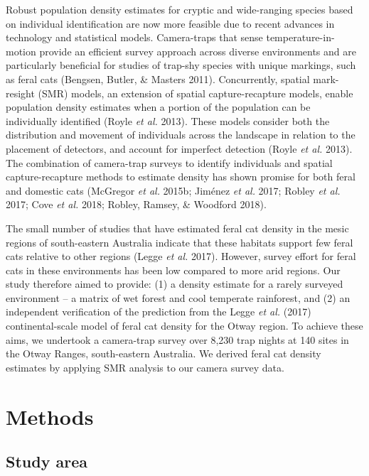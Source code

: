 \documentclass[11pt,a4paper,titlepage,twoside,openright]{style/unimelbthesis}
\begin{document}
\begin{mainmatter}
Robust population density estimates for cryptic and wide-ranging species based on individual identification are now more feasible due to recent advances in technology and statistical models. Camera-traps that sense temperature-in-motion provide an efficient survey approach across diverse environments and are particularly beneficial for studies of trap-shy species with unique markings, such as feral cats (Bengsen, Butler, \& Masters 2011). Concurrently, spatial mark-resight (SMR) models, an extension of spatial capture-recapture models, enable population density estimates when a portion of the population can be individually identified (Royle \emph{et al.} 2013). These models consider both the distribution and movement of individuals across the landscape in relation to the placement of detectors, and account for imperfect detection (Royle \emph{et al.} 2013). The combination of camera-trap surveys to identify individuals and spatial capture-recapture methods to estimate density has shown promise for both feral and domestic cats (McGregor \emph{et al.} 2015b; Jiménez \emph{et al.} 2017; Robley \emph{et al.} 2017; Cove \emph{et al.} 2018; Robley, Ramsey, \& Woodford 2018).

The small number of studies that have estimated feral cat density in the mesic regions of south-eastern Australia indicate that these habitats support few feral cats relative to other regions (Legge \emph{et al.} 2017). However, survey effort for feral cats in these environments has been low compared to more arid regions. Our study therefore aimed to provide: (1) a density estimate for a rarely surveyed environment -- a matrix of wet forest and cool temperate rainforest, and (2) an independent verification of the prediction from the Legge \emph{et al.} (2017) continental-scale model of feral cat density for the Otway region. To achieve these aims, we undertook a camera-trap survey over 8,230 trap nights at 140 sites in the Otway Ranges, south-eastern Australia. We derived feral cat density estimates by applying SMR analysis to our camera survey data.

\newpage

\hypertarget{methods}{%
\section{Methods}\label{methods}}

\hypertarget{study-area}{%
\subsection{Study area}\label{study-area}}


\end{mainmatter}
\end{document}
